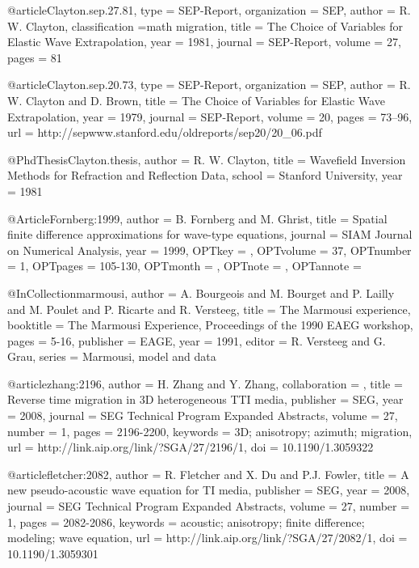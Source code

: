 {@article{Clayton.sep.27.81,
  type =	 {SEP-Report},
  organization = {SEP},
  author =	 {R. W. Clayton},
  classification ={math migration},
  title =	 {The Choice of Variables for Elastic Wave
                  Extrapolation},
  year =	 1981,
  journal =	 {SEP-Report},
  volume =	 27,
  pages =	 81
}

@article{Clayton.sep.20.73,
  type =	 {SEP-Report},
  organization = {SEP},
  author =	 {R. W. Clayton and D. Brown},
  title =	 {The Choice of Variables for Elastic Wave
                  Extrapolation},
  year =	 1979,
  journal =	 {SEP-Report},
  volume =	 20,
  pages =	 {73--96},
  url =
                  {http://sepwww.stanford.edu/oldreports/sep20/20_06.pdf}
}

@PhdThesis{Clayton.thesis,
  author =	 {R. W. Clayton},
  title =	 {Wavefield Inversion Methods for Refraction and
                  Reflection Data},
  school =	 {Stanford University},
  year =	 1981
}

@Article{Fornberg:1999,
  author = 	 {B. Fornberg and M. Ghrist},
  title = 	 {Spatial finite difference approximations for
                  wave-type equations},
  journal = 	 {SIAM Journal on Numerical Analysis},
  year = 	 {1999},
  OPTkey = 	 {},
  OPTvolume = 	 {37},
  OPTnumber = 	 {1},
  OPTpages = 	 {105-130},
  OPTmonth = 	 {},
  OPTnote = 	 {},
  OPTannote = 	 {}
}

@InCollection{marmousi,
  author =	 {A. Bourgeois and M. Bourget and P. Lailly and
                  M. Poulet and P. Ricarte and R. Versteeg},
  title =	 {The {M}armousi experience},
  booktitle =	 {The Marmousi Experience, Proceedings of the 1990
                  EAEG workshop},
  pages =	 {5-16},
  publisher =    {EAGE},
  year =	 1991,
  editor =	 {R. Versteeg and G. Grau},
  series =	 {Marmousi, model and data}
}

@article{zhang:2196,
author = {H. Zhang and Y. Zhang},
collaboration = {},
title = {Reverse time migration in 3{D} heterogeneous {TTI} media},
publisher = {SEG},
year = {2008},
journal = {SEG Technical Program Expanded Abstracts},
volume = {27},
number = {1},
pages = {2196-2200},
keywords = {3D; anisotropy; azimuth; migration},
url = {http://link.aip.org/link/?SGA/27/2196/1},
doi = {10.1190/1.3059322}
}

@article{fletcher:2082,
  author =	 {R. Fletcher and X. Du and P.J. Fowler},
  title =	 {A new pseudo-acoustic wave equation for {TI} media},
  publisher =	 {SEG},
  year =	 2008,
  journal =	 {SEG Technical Program Expanded Abstracts},
  volume =	 27,
  number =	 1,
  pages =	 {2082-2086},
  keywords =	 {acoustic; anisotropy; finite difference; modeling;
                  wave equation},
  url =		 {http://link.aip.org/link/?SGA/27/2082/1},
  doi =		 {10.1190/1.3059301}
}

}
